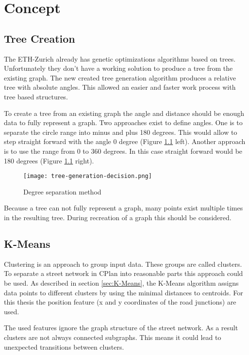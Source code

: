 \chapter{Concept}
\section{Tree Creation}
\label{sec:tree_creation_angle}
The ETH-Zurich already has genetic optimizations algorithms based on trees. Unfortunately they don't have a working solution to produce a tree from the existing graph. The new created tree generation algorithm produces a relative tree with absolute angles. This allowed an easier and faster work process with tree based structures.

To create a tree from an existing graph the angle and distance should be enough data to fully represent a graph.
Two approaches exist to define angles. One is to separate the circle range into minus and plus 180 degrees. This would allow to step straight forward with the angle 0 degree (Figure \ref{fig:tree-generation-decision} left). Another approach is to use the range from 0 to 360 degrees. In this case straight forward would be 180 degrees (Figure \ref{fig:tree-generation-decision} right).

\begin{figure}[!ht]
    \centering
    \texttt{[image: tree-generation-decision.png]}
    \caption{Degree separation method \label{fig:tree-generation-decision}}
\end{figure}

Because a tree can not fully represent a graph, many points exist multiple times in the resulting tree. During recreation of a graph this should be considered.

\FloatBarrier
\pagebreak
\section{K-Means}
Clustering is an approach to group input data. These groups are called clusters. To separate a street network in CPlan into reasonable parts this approach could be used. As described in section \ref{sec:K-Means}, the K-Means algorithm assigns data points to different clusters by using the minimal distances to centroids. For this thesis the position feature (x and y coordinates of the road junctions) are used.

The used features ignore the graph structure of the street network. As a result clusters are not always connected subgraphs. This means it could lead to unexpected transitions between clusters.

